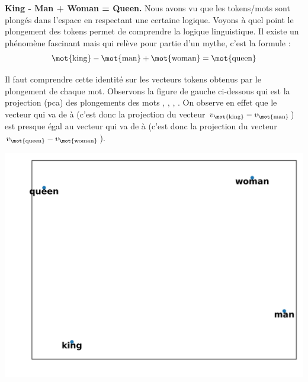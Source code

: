 \documentclass[11pt,class=report,crop=false]{standalone}
\begin{document}
\bigskip

\textbf{King - Man + Woman = Queen.}
Nous avons vu que les tokens/mots sont plongés dans l'espace en respectant une certaine logique. Voyons à quel point le plongement des tokens permet de comprendre la logique linguistique.
Il existe un phénomène fascinant mais qui relève pour partie d'un mythe, c'est la formule :
$$\text{\mot{king}} - \text{\mot{man}}  + \text{\mot{woman}} = \text{\mot{queen}}$$

Il faut comprendre cette identité sur les vecteurs tokens obtenus par le plongement de chaque mot. Observons la figure de gauche ci-dessous qui est la projection (pca) des plongements des mots , , , . On observe en effet que le vecteur qui va de  à  (c'est donc la projection du vecteur $v_{\text{\mot{king}}} - v_{\text{\mot{man}}}$) est presque égal au vecteur qui va de   à  (c'est donc la projection du vecteur $v_{\text{\mot{queen}}} - v_{\text{\mot{woman}}}$).

\begin{center}
\begin{minipage}{0.5\textwidth}
\includegraphics[scale=\myscale,scale=0.5]{figures/projection-pca-5}
\end{minipage}
\begin{minipage}{0.45\textwidth}
\end{minipage}
\end{center}
\end{document}
